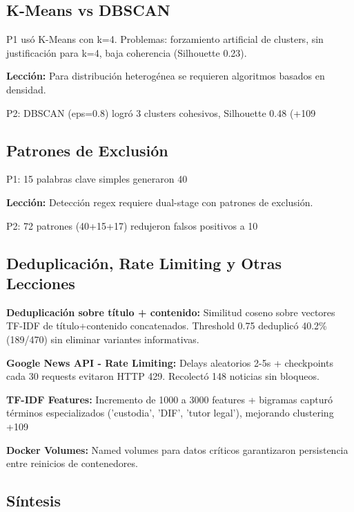 \subsection{K-Means vs DBSCAN}
\label{subsec:leccion_kmeans}

P1 usó K-Means con k=4. Problemas: forzamiento artificial de clusters, sin justificación para k=4, baja coherencia (Silhouette 0.23).

\textbf{Lección:} Para distribución heterogénea se requieren algoritmos basados en densidad.

P2: DBSCAN (eps=0.8) logró 3 clusters cohesivos, Silhouette 0.48 (+109%

\subsection{Patrones de Exclusión}
\label{subsec:leccion_detector}

P1: 15 palabras clave simples generaron 40%

\textbf{Lección:} Detección regex requiere dual-stage con patrones de exclusión.

P2: 72 patrones (40+15+17) redujeron falsos positivos a 10%

\subsection{Deduplicación, Rate Limiting y Otras Lecciones}
\label{subsec:leccion_otras}

\textbf{Deduplicación sobre título + contenido:} Similitud coseno sobre vectores TF-IDF de título+contenido concatenados. Threshold 0.75 deduplicó 40.2\% (189/470) sin eliminar variantes informativas.

\textbf{Google News API - Rate Limiting:} Delays aleatorios 2-5s + checkpoints cada 30 requests evitaron HTTP 429. Recolectó 148 noticias sin bloqueos.

\textbf{TF-IDF Features:} Incremento de 1000 a 3000 features + bigramas capturó términos especializados ('custodia', 'DIF', 'tutor legal'), mejorando clustering +109%

\textbf{Docker Volumes:} Named volumes para datos críticos garantizaron persistencia entre reinicios de contenedores.

\subsection{Síntesis}
\label{subsec:sintesis_aprendizajes}

